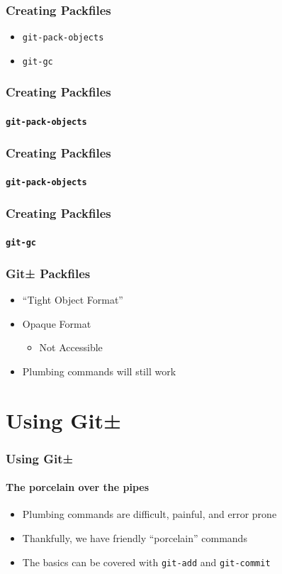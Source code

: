 \documentclass{beamer}
\begin{document}
\begin{frame}
\frametitle{Creating Packfiles}
\begin{itemize}
\item<1->{\texttt{git-pack-objects}}
\item<2->{\texttt{git-gc}}
\end{itemize}
\end{frame}

\begin{frame}[fragile]
\frametitle{Creating Packfiles}
\framesubtitle{\texttt{git-pack-objects}}

\end{frame}

\begin{frame}[fragile]
\frametitle{Creating Packfiles}
\framesubtitle{\texttt{git-pack-objects}}

\end{frame}

\begin{frame}[fragile]
\frametitle{Creating Packfiles}
\framesubtitle{\texttt{git-gc}}

\end{frame}

\begin{frame}
\frametitle{Git± Packfiles}
\begin{itemize}
\item{``Tight Object Format''}
\item{Opaque Format}
\begin{itemize}
\item{Not Accessible}
\end{itemize}
\item{Plumbing commands will still work}
\end{itemize}
\end{frame}

\section{Using Git±}
\begin{frame}
\frametitle{Using Git±}
\framesubtitle{The porcelain over the pipes}
\begin{itemize}
\item{Plumbing commands are difficult, painful, and error prone}
\item{Thankfully, we have friendly ``porcelain'' commands}
\item{The basics can be covered with \texttt{git-add} and \texttt{git-commit}}
\end{itemize}
\end{frame}
\end{document}
